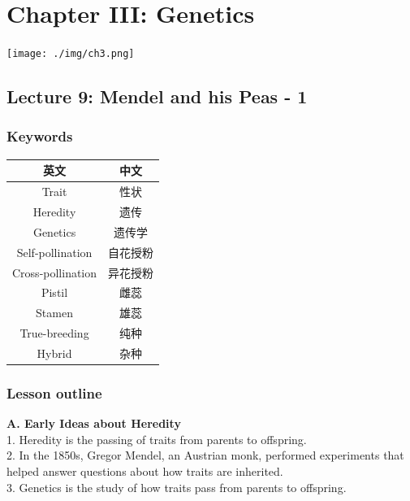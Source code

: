 \documentclass[
]{book}
\begin{document}
\hypertarget{chapter-iii-genetics}{%
\chapter{Chapter III: Genetics}\label{chapter-iii-genetics}}

\texttt{[image: ./img/ch3.png]}

\hypertarget{lecture-9-mendel-and-his-peas---1}{%
\section{Lecture 9: Mendel and his Peas - 1}\label{lecture-9-mendel-and-his-peas---1}}

\hypertarget{keywords-2}{%
\subsection{Keywords}\label{keywords-2}}

\begin{longtable}[]{@{}cc@{}}
\toprule\noalign{}
英文 & 中文 \\
\midrule\noalign{}
\endhead
\bottomrule\noalign{}
\endlastfoot
Trait & 性状 \\
Heredity & 遗传 \\
Genetics & 遗传学 \\
Self-pollination & 自花授粉 \\
Cross-pollination & 异花授粉 \\
Pistil & 雌蕊 \\
Stamen & 雄蕊 \\
True-breeding & 纯种 \\
Hybrid & 杂种 \\
\end{longtable}

\hypertarget{lesson-outline-5}{%
\subsection{Lesson outline}\label{lesson-outline-5}}

\textbf{A. Early Ideas about Heredity}\\
1. {Heredity} is the passing of traits from parents to offspring.\\
2. In the 1850s, {Gregor Mendel}, an Austrian monk, performed experiments that helped answer questions about how traits are inherited.\\
3. {Genetics} is the study of how traits pass from parents to offspring.
\end{document}
